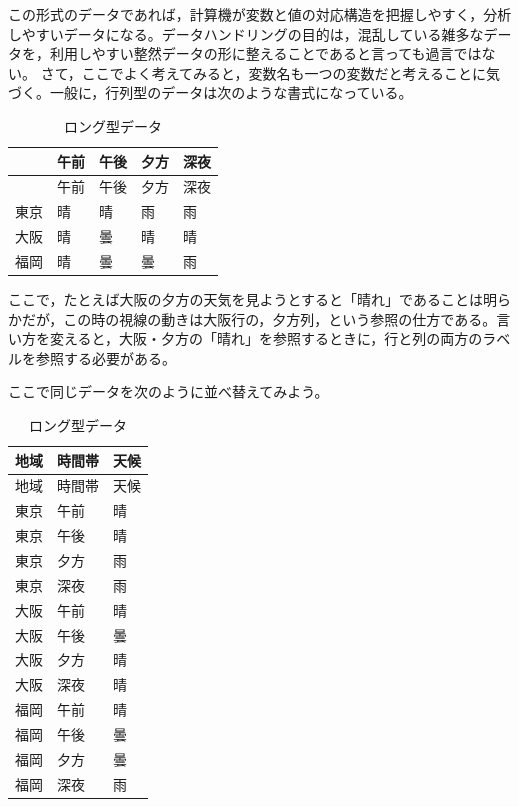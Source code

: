 \documentclass[
  a4paper,
]{ltjsbook}
\begin{document}
この形式のデータであれば，計算機が変数と値の対応構造を把握しやすく，分析しやすいデータになる。データハンドリングの目的は，混乱している雑多なデータを，利用しやすい整然データの形に整えることであると言っても過言ではない。
さて，ここでよく考えてみると，変数名も一つの変数だと考えることに気づく。一般に，行列型のデータは次のような書式になっている。

\begin{longtable}[]{@{}lllll@{}}
\caption{ロング型データ}\tabularnewline
\toprule\noalign{}
& 午前 & 午後 & 夕方 & 深夜 \\
\midrule\noalign{}
\endfirsthead
\toprule\noalign{}
& 午前 & 午後 & 夕方 & 深夜 \\
\midrule\noalign{}
\endhead
\bottomrule\noalign{}
\endlastfoot
東京 & 晴 & 晴 & 雨 & 雨 \\
大阪 & 晴 & 曇 & 晴 & 晴 \\
福岡 & 晴 & 曇 & 曇 & 雨 \\
\end{longtable}

ここで，たとえば大阪の夕方の天気を見ようとすると「晴れ」であることは明らかだが，この時の視線の動きは大阪行の，夕方列，という参照の仕方である。言い方を変えると，大阪・夕方の「晴れ」を参照するときに，行と列の両方のラベルを参照する必要がある。

ここで同じデータを次のように並べ替えてみよう。

\begin{longtable}[]{@{}lll@{}}
\caption{ロング型データ}\tabularnewline
\toprule\noalign{}
地域 & 時間帯 & 天候 \\
\midrule\noalign{}
\endfirsthead
\toprule\noalign{}
地域 & 時間帯 & 天候 \\
\midrule\noalign{}
\endhead
\bottomrule\noalign{}
\endlastfoot
東京 & 午前 & 晴 \\
東京 & 午後 & 晴 \\
東京 & 夕方 & 雨 \\
東京 & 深夜 & 雨 \\
大阪 & 午前 & 晴 \\
大阪 & 午後 & 曇 \\
大阪 & 夕方 & 晴 \\
大阪 & 深夜 & 晴 \\
福岡 & 午前 & 晴 \\
福岡 & 午後 & 曇 \\
福岡 & 夕方 & 曇 \\
福岡 & 深夜 & 雨 \\
\end{longtable}
\end{document}

